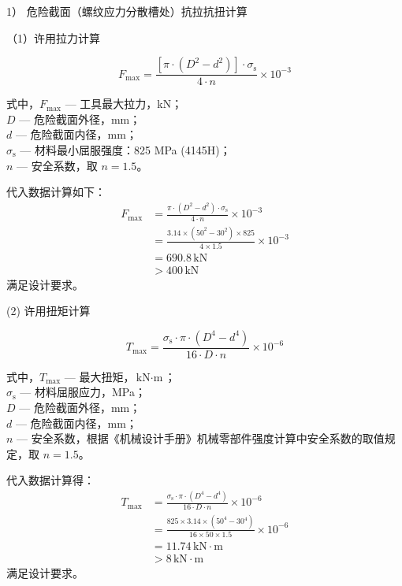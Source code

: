 1） 危险截面（螺纹应力分散槽处）抗拉抗扭计算

（1）许用拉力计算

\begin{equation}
    F_{\max} = \frac{[\pi \cdot (D^2 - d^2)] \cdot \sigma_{\mathrm{s}}}{4 \cdot n} \times 10^{-3}
\end{equation}

式中，$F_{\max}$ — 工具最大拉力，kN；\\
$D$ — 危险截面外径，mm；\\
$d$ — 危险截面内径，mm；\\
$\sigma_{\mathrm{s}}$ — 材料最小屈服强度：825 MPa (4145H)；\\
$n$ — 安全系数，取 $n = 1.5$。

代入数据计算如下：
\begin{align}
    F_{\max} &= \frac{\pi \cdot (D^2 - d^2) \cdot \sigma_{\mathrm{s}}}{4 \cdot n} \times 10^{-3} \\
             &= \frac{3.14 \times (50^2 - 30^2) \times 825}{4 \times 1.5} \times 10^{-3} \\
             &= 690.8 \, \text{kN} \\
             &> 400 \, \text{kN}
\end{align}
满足设计要求。

(2) 许用扭矩计算

\begin{equation}
    T_{\max} = \frac{\sigma_{\mathrm{s}} \cdot \pi \cdot (D^4 - d^4)}{16 \cdot D \cdot n} \times 10^{-6}
\end{equation}

式中，$T_{\max}$ — 最大扭矩，$\text{kN} \cdot \text{m}$；\\
$\sigma_{\mathrm{s}}$ — 材料屈服应力，MPa；\\
$D$ — 危险截面外径，mm；\\
$d$ — 危险截面内径，mm；\\
$n$ — 安全系数，根据《机械设计手册》机械零部件强度计算中安全系数的取值规定\cite{ref26}，取 $n = 1.5$。

代入数据计算得：
\begin{align}
    T_{\max} &= \frac{\sigma_{\mathrm{s}} \cdot \pi \cdot (D^4 - d^4)}{16 \cdot D \cdot n} \times 10^{-6} \\
             &= \frac{825 \times 3.14 \times (50^4 - 30^4)}{16 \times 50 \times 1.5} \times 10^{-6} \\
             &= 11.74 \, \text{kN} \cdot \text{m} \\
             &> 8 \, \text{kN} \cdot \text{m}
\end{align}
满足设计要求。

